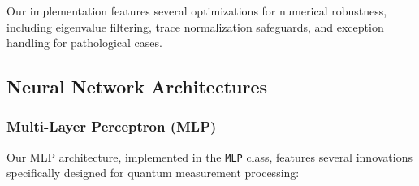 \documentclass{optica-article}
\begin{document}
Our implementation features several optimizations for numerical robustness, including eigenvalue filtering, trace normalization safeguards, and exception handling for pathological cases.

\subsection{Neural Network Architectures}

\subsubsection{Multi-Layer Perceptron (MLP)}

Our MLP architecture, implemented in the \texttt{MLP} class, features several innovations specifically designed for quantum measurement processing:
\end{document}
